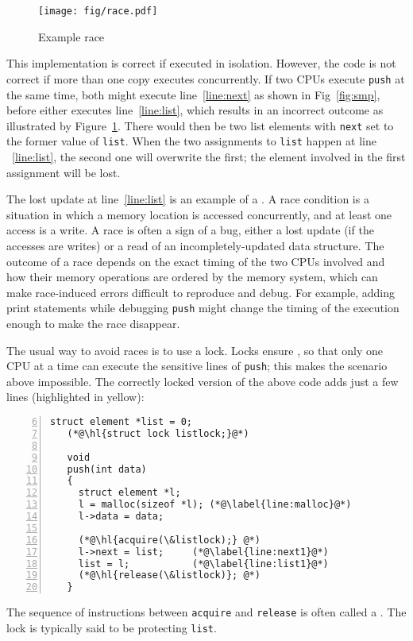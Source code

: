 \begin{figure}[t]
\center
\texttt{[image: fig/race.pdf]}
\caption{Example race}
\label{fig:race}
\end{figure}
This implementation is correct if executed in isolation.
However, the code is not correct if more than one
copy executes concurrently.
If two CPUs execute
\lstinline{push}
at the same time,
both might execute line~\ref{line:next} as shown in Fig~\ref{fig:smp},
before either executes line~\ref{line:list},  which results
in an incorrect outcome as illustrated by Figure~\ref{fig:race}.
There would then be two
list elements with
\lstinline{next}
set to the former value of
\lstinline{list}.
When the two assignments to
\lstinline{list}
happen at line ~\ref{line:list},
the second one will overwrite the first;
the element involved in the first assignment
will be lost.

The lost update at line~\ref{line:list} is an example of a
.
A race condition is a situation in which a memory location is accessed
concurrently, and at least one access is a write.
A race is often a sign of a bug, either a lost update
(if the accesses are writes) or a read of
an incompletely-updated data structure.
The outcome of a race depends on
the exact timing of the two CPUs involved and
how their memory operations are ordered by the memory system,
which can make race-induced errors difficult to reproduce
and debug.
For example, adding print statements while debugging
\lstinline{push}
might change the timing of the execution enough
to make the race disappear.

The usual way to avoid races is to use a lock.
Locks ensure
,
so that only one CPU at a time can execute 
the sensitive lines of
\lstinline{push};
this makes the scenario above impossible.
The correctly locked version of the above code
adds just a few lines (highlighted in yellow):
\begin{lstlisting}[numbers=left,firstnumber=6]
   struct element *list = 0;
   (*@\hl{struct lock listlock;}@*)
    	
   void
   push(int data)
   {
     struct element *l;
     l = malloc(sizeof *l); (*@\label{line:malloc}@*)
     l->data = data;
   
     (*@\hl{acquire(\&listlock);} @*)
     l->next = list;     (*@\label{line:next1}@*)
     list = l;           (*@\label{line:list1}@*)
     (*@\hl{release(\&listlock)}; @*)
   }
\end{lstlisting}
The sequence of instructions between
\lstinline{acquire}
and
\lstinline{release}
is often called a
.
The lock is typically said to be protecting
\lstinline{list}.


